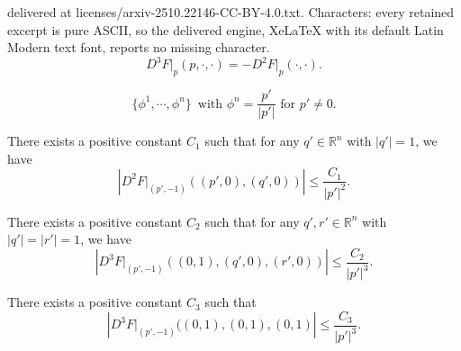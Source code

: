 \documentclass[10pt,a4paper]{amsart}
\begin{document}
delivered at licenses/arxiv-2510.22146-CC-BY-4.0.txt. Characters: every retained excerpt is pure ASCII, so the delivered engine, XeLaTeX with its default Latin Modern text font, reports no missing character.
\begin{equation} \label{homc3}
    D^3 F\Big|_p (p,\cdot,\cdot) = -D^2 F\Big|_p (\cdot,\cdot).
\end{equation}

\begin{equation}\label{ONB}
\{\phi^1, \cdots, \phi^n\}\,\,\,\text{with $\phi^n = \frac{p'}{|p'|}$ for $p'\neq0$.}
\end{equation}

\begin{lemma} \label{lem:2.1}
    There exists a positive constant $C_1$ such that for any $q'\in \mathbb{R}^n$ with $|q'|=1$, we have
\begin{equation}\label{eq:lem2.1}
    \left|D^2 F\Big|_{(p',-1)} ((p',0), (q',0))\right| \leq \frac{C_1}{|p'|^2}.
\end{equation}
\end{lemma}

\begin{lemma} \label{lem:2.2}
There exists a positive constant $C_2$ such that for any $q',r'\in \mathbb{R}^n$ with $|q'|=|r'|=1$, we have
\begin{equation}
  \left|  D^3 F\Big|_{(p',-1)} ((0,1),(q',0),(r',0) ) \right| \leq \frac{C_2}{|p'|^3}.
\end{equation}
\end{lemma}

\begin{lemma} \label{lem:2.3}
There exists a positive constant $C_3$ such that 
\begin{equation}
  \left|  D^3 F\Big|_{(p',-1)} ((0,1),(0,1),(0,1) \right| \leq \frac{C_3}{|p'|^3}.
\end{equation}
\end{lemma}
\end{document}
